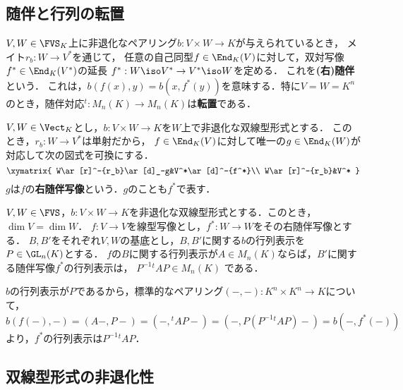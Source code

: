 \documentclass[uplatex, dvipdfmx]{jsreport}
\begin{document}
\subsection{随伴と行列の転置}

\begin{tcolorbox}[colframe=ForestGreen, colback=ForestGreen!10!white,breakable,colbacktitle=ForestGreen!40!white,coltitle=black,fonttitle=\bfseries\sffamily,
title=]
    $V,W\in\FVS_K$上に非退化なペアリング$b:V\times W\to K$が与えられているとき，
    メイト$r_b:W\to V^*$を通じて，
    任意の自己同型$f\in\End_K(V)$に対して，双対写像$f^*\in\End_K(V^*)$の延長
    $f^*:W\iso V^*\to V^*\iso W$を定める．
    これを\textbf{(右)随伴}という．
    これは，$b(f(x),y)=b(x,f^*(y))$を意味する．特に$V=W=K^n$のとき，随伴対応${}^t\!:M_n(K)\to M_n(K)$は\textbf{転置}である．
\end{tcolorbox}

\begin{definition}
    $V,W\in\Vect_K$とし，$b:V\times W\to K$を$W$上で非退化な双線型形式とする．
    このとき，$r_b:W\to V^*$は単射だから，
    $f\in\End_K(V)$に対して唯一の$g\in\End_K(W)$が対応して次の図式を可換にする．
    \[\xymatrix{
            W\ar[r]^-{r_b}\ar[d]_-g&V^*\ar[d]^-{f^*}\\
            W\ar[r]^-{r_b}&V^*
        }\]
    $g$は$f$の\textbf{右随伴写像}という．$g$のことも$f^*$で表す．
\end{definition}

\begin{proposition}[随伴写像の行列表示]
    $V,W\in\FVS$，$b:V\times W\to K$を非退化な双線型形式とする．このとき，$\dim V=\dim W$．
    $f:V\to V$を線型写像とし，$f^*:W\to W$をその右随伴写像とする．
    $B,B'$をそれぞれ$V,W$の基底とし，$B,B'$に関する$b$の行列表示を$P\in\GL_n(K)$とする．
    $f$の$B$に関する行列表示が$A\in M_n(K)$ならば，$B'$に関する随伴写像$f^*$の行列表示は，
    $P^{-1}{}^t\!AP\in M_n(K)$
    である．
\end{proposition}
\begin{Proof}
    $b$の行列表示が$P$であるから，標準的なペアリング$(-,-):K^n\times K^n\to K$について，
    \[b(f(-),-)=(A-,P-)=(-,{}^t\!AP-)=(-,P(P^{-1}{}^t\!AP)-)=b(-,f^*(-))\]
    より，$f^*$の行列表示は$P^{-1}{}^t\!AP$．
\end{Proof}

\subsection{双線型形式の非退化性}
\end{document}
